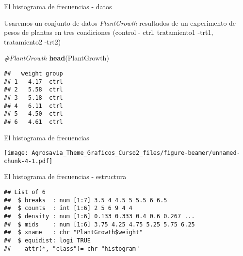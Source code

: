 \documentclass[ignorenonframetext,]{beamer}
\newenvironment{Shaded}{\begin{snugshade}}{\end{snugshade}}
\newcommand{\KeywordTok}[1]{\textcolor[rgb]{0.13,0.29,0.53}{\textbf{#1}}}
\newcommand{\DataTypeTok}[1]{\textcolor[rgb]{0.13,0.29,0.53}{#1}}
\newcommand{\CommentTok}[1]{\textcolor[rgb]{0.56,0.35,0.01}{\textit{#1}}}
\newcommand{\OtherTok}[1]{\textcolor[rgb]{0.56,0.35,0.01}{#1}}
\newcommand{\OperatorTok}[1]{\textcolor[rgb]{0.81,0.36,0.00}{\textbf{#1}}}
\newcommand{\NormalTok}[1]{#1}
\begin{document}
\begin{frame}[fragile]{El histograma de frecuencias - datos}

Usaremos un conjunto de datos \textit{PlantGrowth} resultados de un
experimento de pesos de plantas en tres condiciones (control - ctrl,
tratamiento1 -trt1, tratamiento2 -trt2)

\begin{Shaded}
\begin{Highlighting}[]
\CommentTok{#PlantGrowth}
\KeywordTok{head}\NormalTok{(PlantGrowth)}
\end{Highlighting}
\end{Shaded}

\begin{verbatim}
##   weight group
## 1   4.17  ctrl
## 2   5.58  ctrl
## 3   5.18  ctrl
## 4   6.11  ctrl
## 5   4.50  ctrl
## 6   4.61  ctrl
\end{verbatim}

\end{frame}

\begin{frame}[fragile]{El histograma de frecuencias}

\begin{Shaded}
\end{Shaded}

\texttt{[image: Agrosavia\_Theme\_Graficos\_Curso2\_files/figure-beamer/unnamed-chunk-4-1.pdf]}

\end{frame}

\begin{frame}[fragile]{El histograma de frecuencias - estructura}

\begin{Shaded}
\end{Shaded}

\begin{verbatim}
## List of 6
##  $ breaks  : num [1:7] 3.5 4 4.5 5 5.5 6 6.5
##  $ counts  : int [1:6] 2 5 6 9 4 4
##  $ density : num [1:6] 0.133 0.333 0.4 0.6 0.267 ...
##  $ mids    : num [1:6] 3.75 4.25 4.75 5.25 5.75 6.25
##  $ xname   : chr "PlantGrowth$weight"
##  $ equidist: logi TRUE
##  - attr(*, "class")= chr "histogram"
\end{verbatim}

\end{frame}
\end{document}
